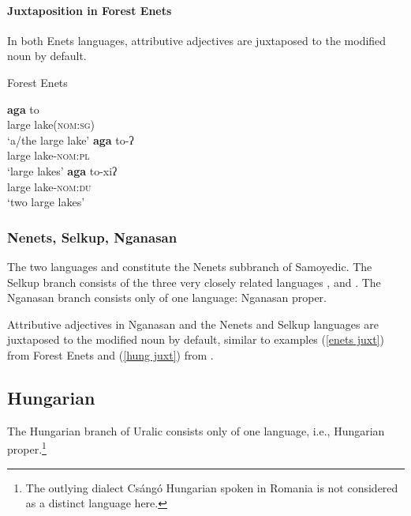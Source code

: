 \paragraph*{Juxtaposition in Forest Enets}
In both Enets languages, attributive adjectives are juxtaposed to the modified noun by default.
\begin{exe}
\ex \rm{Forest Enets  \citep[71]{siegl2013a}}
\label{enets juxt}
\begin{xlist}
\ex 
\gll	\textbf{aga} to\\
	large lake(\textsc{nom:sg})\\
\glt	‘a/the large lake’
\ex 
\gll	\textbf{aga} to-ʔ\\
	large lake\textsc{-nom:pl}\\
\glt	‘large lakes’
\ex 
\gll	\textbf{aga} to-xiʔ\\
	large lake\textsc{-nom:du}\\
\glt	‘two large lakes’
\end{xlist}
\end{exe}

\subsubsection{Nenets, Selkup, Nganasan}
The two languages  and  constitute the Nenets subbranch of Samoyedic. The Selkup branch consists of the three very closely related languages ,  and . The Nganasan branch consists only of one language: Nganasan proper.

Attributive adjectives in Nganasan and the Nenets and Selkup languages are juxtaposed to the modified noun by default, similar to examples (\ref{enets juxt}) from Forest Enets and (\ref{hung juxt}) from .

\subsection{Hungarian}
The Hungarian branch of Uralic consists only of one language, i.e., Hungarian proper.\footnote{The outlying dialect Csángó Hungarian spoken in Romania is not considered as a distinct language here.}

